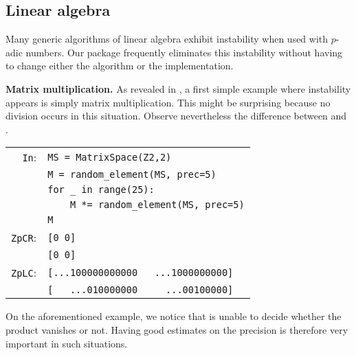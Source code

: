 \documentclass[sigconf]{acmart}
\newcommand{\ZpCR}{\text{\color{output} \rm \tt ZpCR}\xspace}
\newcommand{\ZpL}{\text{\color{output} \rm \tt ZpL}\xspace}
\newcommand{\ZpLC}{\text{\color{output} \rm \tt ZpLC}\xspace}
\newcommand{\cIn}{{\color{input} \tt \phantom{Zp}In}:}
\newcommand{\cZpCR}{{\color{output} \tt ZpCR}:}
\newcommand{\cZpLC}{{\color{output} \tt ZpLC}:}
\theoremstyle{definition}
\begin{document}
\subsection{Linear algebra}
\label{ssec:linalg}

Many generic algorithms of linear algebra exhibit
instability when used with $p$-adic numbers.
Our package \ZpL frequently eliminates this instability without having to change either the 
algorithm or the implementation.

\medskip

\noindent \textbf{Matrix multiplication.}
%
As revealed in \cite{caruso-roe-vaccon:15}, a first simple example where 
instability appears is simply matrix multiplication.
This might be surprising because no division occurs in this situation.
Observe nevertheless the difference between \ZpCR and \ZpLC.

\smallskip

{\noindent \small
\begin{tabular}{rl}
\cIn
 & \verb?MS = ?{\color{constructor}\verb?MatrixSpace?}\verb?(?{\color{ring}\verb?Z2?}\verb?,2)? \\
 & \verb?M = ?{\color{function}\verb?random_element?}\verb?(MS, prec=5)? \\
 & \verb?for _ in range(25):? \\
 & \verb?    M *= ?{\color{function}\verb?random_element?}\verb?(MS, prec=5)? \\
 & \verb?M? \\
\cZpCR
 & \verb?[0 0]? \\
 & \verb?[0 0]? \\
\cZpLC
 & \verb?[...100000000000   ...1000000000]? \\
 & \verb?[   ...010000000     ...00100000]? \\
\end{tabular}}


\smallskip

\noindent
On the aforementioned example, we notice that \ZpCR is unable to decide 
whether the product vanishes or not. Having good estimates on the 
precision is therefore very important in such situations.
\end{document}
